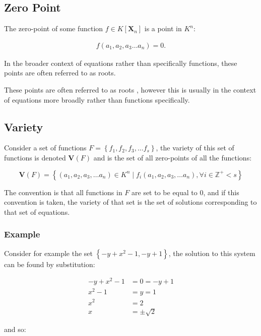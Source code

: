 \documentclass[a4paper,11pt,twoside]{article}
\begin{document}
\subsection{Zero Point}
\label{sec:orgdde5449}
The zero-point of some function \(f\in K\left[\mathbf{X}_n\right]\) is a point in \(K^n\):  \cite{hibiGrobnerBasesStatistics2014}

\begin{align*}
      f\left( a_1, a_2, a_3 \ldots a_n \right) =0
.\end{align*}

In the broader context of equations rather than specifically
functions, these points are often referred to as roots.

These points are often referred to as roots
\cite[\S 17.2]{judsonAbstractAlgebraTheory2016}, however this is
usually in the context of equations more broadly rather than
functions specifically. \cite{82645}
\subsection{Variety}
\label{sec:org2043b4b}
Consider a set of functions \(F=\left\{ f_{1},f_{2},f_{3},\ldots
   f_{s}\right\}\), the variety of this set of functions is denoted
\(\mathbf{V}\left(F\right)\) and is the set of all zero-points of
all the functions:

\[
   \boldsymbol{V}\left(F\right)=\left\{ \left(a_{1},a_{2},a_{3},\ldots a_{n}\right)\in K^{n}\mid f_{i}\left(a_{1},a_{2},a_{3},\ldots a_{n}\right),\forall i\in\mathbb{Z}^{+}<s\right\} 
   \]

The convention is that all functions in \(F\) are set to be equal
to 0, and if this convention is taken, the variety of that set is
the set of solutions corresponding to that set of equations.
\subsubsection{Example}
\label{sec:org956f93e}
Consider for example the set \(\left\{ -y+x^{2}-1,-y+1\right\}\),
the solution to this system can be found by substitution:


 \begin{align*}
    -y + x^{2}-1	&=0=-y+1 \\
    x^{2}-1	&=y=1 \\
    x^{2}	&=2   \\
    x	&=\pm\sqrt{2}
\end{align*}

and so:
\end{document}
